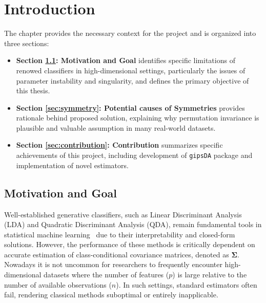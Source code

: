 \documentclass[a4paper,11pt,twoside]{report}
\theoremstyle{definition}
\begin{document}

\null\thispagestyle{empty}\newpage
\pagestyle{fancy}
\setcounter{page}{11}


\chapter{Introduction}

The chapter provides the necessary context for the project and is organized into three sections:
\begin{itemize}
    \item \textbf{Section \ref{sec:motivation}: Motivation and Goal} identifies specific limitations of renowed classifiers in high-dimensional settings, particularly the issues of parameter instability and singularity, and defines the primary objective of this thesis.
    \item \textbf{Section \ref{sec:symmetry}: Potential causes of Symmetries} provides rationale behind proposed solution, explaining why permutation invariance is plausible and valuable assumption in many real-world datasets.
    \item \textbf{Section \ref{sec:contribution}: Contribution} summarizes specific achievements of this project, including development of \texttt{gipsDA} package and implementation of novel estimators.
\end{itemize}

\section{Motivation and Goal}
\label{sec:motivation}

Well-established generative classifiers, such as Linear Discriminant Analysis (LDA) and Quadratic Discriminant Analysis (QDA), remain fundamental tools in statistical machine learning~\cite{elemstats} due to their interpretability and closed-form solutions.
However, the performance of these methods is critically dependent on accurate estimation of class-conditional covariance matrices, denoted as $\boldsymbol{\Sigma}$.
Nowadays it is not uncommon for researchers to frequently encounter high-dimensional datasets where the number of features ($p$) is large relative to the number of available observations ($n$).
In such settings, standard estimators often fail, rendering classical methods suboptimal or entirely inapplicable.
\end{document}
